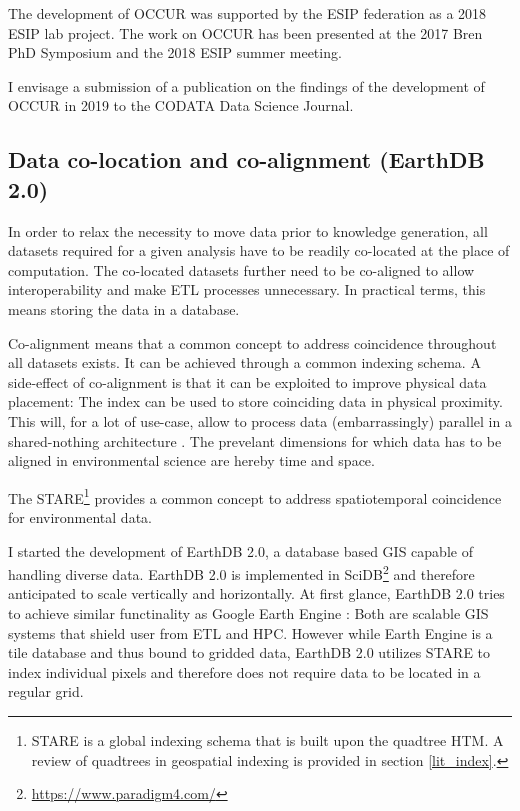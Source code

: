 \documentclass[letterpaper, parskip=half]{scrartcl}
\begin{document}
The development of \gls{OCCUR} was supported by the \gls{ESIP} federation as a 2018 \gls{ESIP} lab project. The work on \gls{OCCUR} has been presented at the 2017 Bren PhD Symposium and the 2018 \gls{ESIP} summer meeting.

I envisage a submission of a publication on the findings of the development of OCCUR in 2019 to the CODATA Data Science Journal.
% 
\newpage

\subsection{Data co-location and co-alignment (EarthDB 2.0)}
In order to relax the necessity to move data prior to knowledge generation, all datasets required for a given analysis have to be readily co-located at the place of computation. The co-located datasets further need to be co-aligned to allow interoperability \citep{Kuo2017, Rilee2016} and make \gls{ETL} processes unnecessary. In practical terms, this means storing the data in a database.

Co-alignment means that a common concept to address coincidence throughout all datasets exists. 
It can be achieved through a common indexing schema. A side-effect of co-alignment is that it can be exploited to improve physical data placement: The index can be used to store coinciding data in physical proximity. This will, for a lot of use-case, allow to process data (embarrassingly) parallel in a shared-nothing architecture \citep{Kuo2017}.
The prevelant dimensions for which data has to be aligned in environmental science are hereby time and space.
 
The \gls{STARE}\footnote{STARE is a global indexing schema that is built upon the quadtree \gls{HTM}. A review of quadtrees in geospatial indexing is provided in section \ref{lit_index}.} \citep{Kuo2017} provides a common concept to address spatiotemporal coincidence for environmental data.

I started the development of EarthDB 2.0, a database based \gls{GIS} capable of handling diverse data. 
EarthDB 2.0 is implemented in SciDB\footnote{\url{https://www.paradigm4.com/}} and therefore anticipated to scale vertically and horizontally.
At first glance, EarthDB 2.0 tries to achieve similar functinality as Google Earth Engine \citep{Gorelick2017}: Both are scalable \gls{GIS} systems that shield user from \gls{ETL} and \gls{HPC}. However while Earth Engine is a tile database and thus bound to gridded data, EarthDB 2.0 utilizes \gls{STARE} to index individual pixels and therefore does not require data to be located in a regular grid. 
\end{document}

